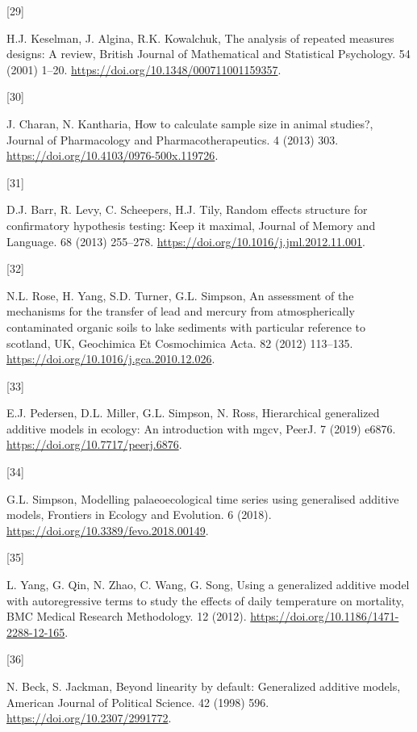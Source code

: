 \documentclass[
]{article}
\newlength{\cslhangindent}
\newlength{\csllabelwidth}
\newlength{\cslentryspacingunit} %
\newenvironment{CSLReferences}[2] %
 {%
  \setlength{\parindent}{0pt}
  \ifodd #1
  \let\oldpar\par
  \def\par{\hangindent=\cslhangindent\oldpar}
  \fi
  \setlength{\parskip}{#2\cslentryspacingunit}
 }%
 {}
\newcommand{\CSLLeftMargin}[1]{\parbox[t]{\csllabelwidth}{#1}}
\newcommand{\CSLRightInline}[1]{\parbox[t]{\linewidth - \csllabelwidth}{#1}\break}
\begin{document}
\begin{CSLReferences}{0}{0}
\leavevmode{}%
\CSLLeftMargin{{[}29{]} }
\CSLRightInline{H.J. Keselman, J. Algina, R.K. Kowalchuk, The analysis of repeated measures designs: A review, British Journal of Mathematical and Statistical Psychology. 54 (2001) 1--20. \url{https://doi.org/10.1348/000711001159357}.}

\leavevmode{}%
\CSLLeftMargin{{[}30{]} }
\CSLRightInline{J. Charan, N. Kantharia, How to calculate sample size in animal studies?, Journal of Pharmacology and Pharmacotherapeutics. 4 (2013) 303. \url{https://doi.org/10.4103/0976-500x.119726}.}

\leavevmode{}%
\CSLLeftMargin{{[}31{]} }
\CSLRightInline{D.J. Barr, R. Levy, C. Scheepers, H.J. Tily, Random effects structure for confirmatory hypothesis testing: Keep it maximal, Journal of Memory and Language. 68 (2013) 255--278. \url{https://doi.org/10.1016/j.jml.2012.11.001}.}

\leavevmode{}%
\CSLLeftMargin{{[}32{]} }
\CSLRightInline{N.L. Rose, H. Yang, S.D. Turner, G.L. Simpson, An assessment of the mechanisms for the transfer of lead and mercury from atmospherically contaminated organic soils to lake sediments with particular reference to scotland, {UK}, Geochimica Et Cosmochimica Acta. 82 (2012) 113--135. \url{https://doi.org/10.1016/j.gca.2010.12.026}.}

\leavevmode{}%
\CSLLeftMargin{{[}33{]} }
\CSLRightInline{E.J. Pedersen, D.L. Miller, G.L. Simpson, N. Ross, Hierarchical generalized additive models in ecology: An introduction with mgcv, {PeerJ}. 7 (2019) e6876. \url{https://doi.org/10.7717/peerj.6876}.}

\leavevmode{}%
\CSLLeftMargin{{[}34{]} }
\CSLRightInline{G.L. Simpson, Modelling palaeoecological time series using generalised additive models, Frontiers in Ecology and Evolution. 6 (2018). \url{https://doi.org/10.3389/fevo.2018.00149}.}

\leavevmode{}%
\CSLLeftMargin{{[}35{]} }
\CSLRightInline{L. Yang, G. Qin, N. Zhao, C. Wang, G. Song, Using a generalized additive model with autoregressive terms to study the effects of daily temperature on mortality, {BMC} Medical Research Methodology. 12 (2012). \url{https://doi.org/10.1186/1471-2288-12-165}.}

\leavevmode{}%
\CSLLeftMargin{{[}36{]} }
\CSLRightInline{N. Beck, S. Jackman, Beyond linearity by default: Generalized additive models, American Journal of Political Science. 42 (1998) 596. \url{https://doi.org/10.2307/2991772}.}


\end{CSLReferences}
\end{document}
